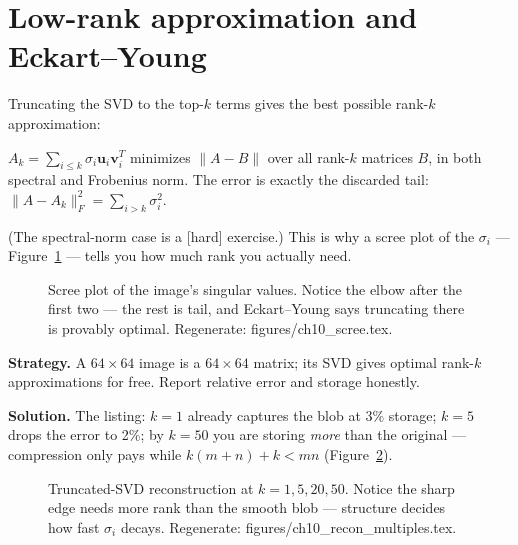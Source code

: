 \section{Low-rank approximation and Eckart--Young}\label{sec:svd-eckart}

Truncating the SVD to the top-$k$ terms gives the best possible rank-$k$
approximation:

\begin{theorem}
$A_k=\sum_{i\le k}\sigma_i\mathbf u_i\mathbf v_i^{T}$ minimizes
$\lVert A-B\rVert$ over all rank-$k$ matrices $B$, in both spectral and
Frobenius norm. The error is exactly the discarded tail:
$\lVert A-A_k\rVert_{F}^{2}=\sum_{i>k}\sigma_i^{2}$.
\end{theorem}

(The spectral-norm case is a [hard] exercise.) This is why a scree plot
of the $\sigma_i$ --- Figure~\ref{fig:scree} --- tells you how much rank
you actually need.

\begin{figure}[htbp]
\centering

\caption{Scree plot of the image's singular values. Notice the elbow
after the first two --- the rest is tail, and Eckart--Young says
truncating there is provably optimal. Regenerate:
\ttfamily figures/ch10\_scree.tex.}
\label{fig:scree}
\end{figure}

\begin{example}\label{ex:imgcompress}
\textbf{Strategy.} A $64\times64$ image is a $64\times64$ matrix; its SVD
gives optimal rank-$k$ approximations for free. Report relative error and
storage honestly.

\textbf{Solution.} The listing: $k=1$ already captures the blob at 3\%
storage; $k=5$ drops the error to 2\%; by $k=50$ you are storing
\emph{more} than the original --- compression only pays while
$k( m+n)+k<mn$ (Figure~\ref{fig:recon}).
\end{example}

\begin{figure}[htbp]
\centering

\caption{Truncated-SVD reconstruction at $k=1,5,20,50$. Notice the sharp
edge needs more rank than the smooth blob --- structure decides how fast
$\sigma_i$ decays. Regenerate:
\ttfamily figures/ch10\_recon\_multiples.tex.}
\label{fig:recon}
\end{figure}


